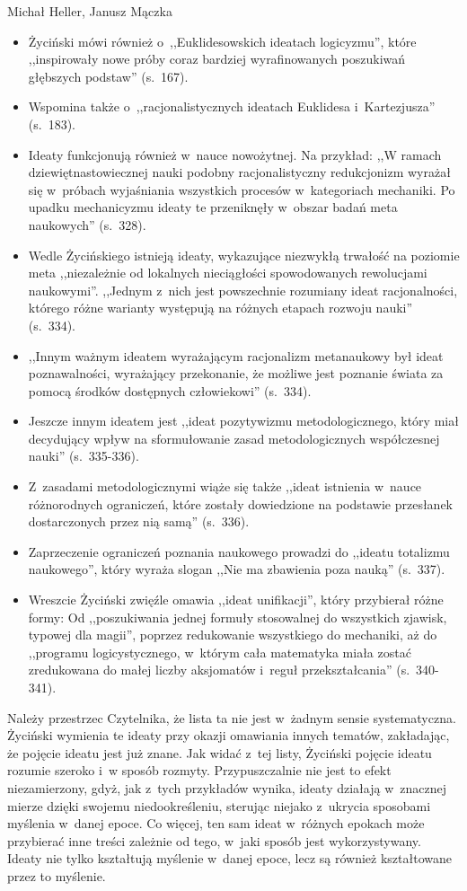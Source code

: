 \begin{newrevplenv2auth}{Michał Heller, Janusz Mączka}
\begin{itemize}
\item Życiński mówi również o~,,Euklidesowskich ideatach logicyzmu'', które ,,inspirowały nowe próby coraz bardziej wyrafinowanych poszukiwań głębszych podstaw'' (s.~167).
\item Wspomina także o~,,racjonalistycznych ideatach Euklidesa i~Kartezjusza'' (s.~183).
\item Ideaty funkcjonują również w~nauce nowożytnej. Na przykład: ,,W ramach dziewiętnastowiecznej nauki podobny racjonalistyczny redukcjonizm wyrażał się w~próbach wyjaśniania wszystkich procesów w~kategoriach mechaniki. Po upadku mechanicyzmu ideaty te przeniknęły w~obszar badań meta naukowych'' (s.~328).
\item Wedle Życińskiego istnieją ideaty, wykazujące niezwykłą trwałość na poziomie meta ,,niezależnie od lokalnych nieciągłości spowodowanych rewolucjami naukowymi''. ,,Jednym z~nich jest powszechnie rozumiany ideat racjonalności, którego różne warianty występują na różnych etapach rozwoju nauki'' (s.~334).
\item ,,Innym ważnym ideatem wyrażającym racjonalizm metanaukowy był ideat poznawalności, wyrażający przekonanie, że możliwe jest poznanie świata za pomocą środków dostępnych człowiekowi'' (s.~334).
\item Jeszcze innym ideatem jest ,,ideat pozytywizmu metodologicznego, który miał decydujący wpływ na sformułowanie zasad metodologicznych współczesnej nauki'' (s.~335-336).
\item Z~zasadami metodologicznymi wiąże się także ,,ideat istnienia w~nauce różnorodnych ograniczeń, które zostały dowiedzione na podstawie przesłanek dostarczonych przez nią samą'' (s.~336).
\item Zaprzeczenie ograniczeń poznania naukowego prowadzi do ,,ideatu totalizmu naukowego'', który wyraża slogan ,,Nie ma zbawienia poza nauką'' (s.~337).
\item Wreszcie Życiński zwięźle omawia ,,ideat unifikacji'', który przybierał różne formy: Od ,,poszukiwania jednej formuły stosowalnej do wszystkich zjawisk, typowej dla magii'', poprzez redukowanie wszystkiego do mechaniki, aż do ,,programu logicystycznego, w~którym cała matematyka miała zostać zredukowana do małej liczby aksjomatów i~reguł przekształcania'' (s.~340-341).
\end{itemize}
Należy przestrzec Czytelnika, że lista ta nie jest w~żadnym sensie systematyczna. Życiński wymienia te ideaty przy okazji omawiania innych tematów, zakładając, że pojęcie ideatu jest już znane. Jak widać z~tej listy, Życiński pojęcie ideatu rozumie szeroko i~w sposób rozmyty. Przypuszczalnie nie jest to efekt niezamierzony, gdyż, jak z~tych przykładów wynika, ideaty działają w~znacznej mierze dzięki swojemu niedookreśleniu, sterując niejako z~ukrycia sposobami myślenia w~danej epoce. Co więcej, ten sam ideat w~różnych epokach może przybierać inne treści zależnie od tego, w~jaki sposób jest wykorzystywany. Ideaty nie tylko kształtują myślenie w~danej epoce, lecz są również kształtowane przez to myślenie.


\end{newrevplenv2auth}

